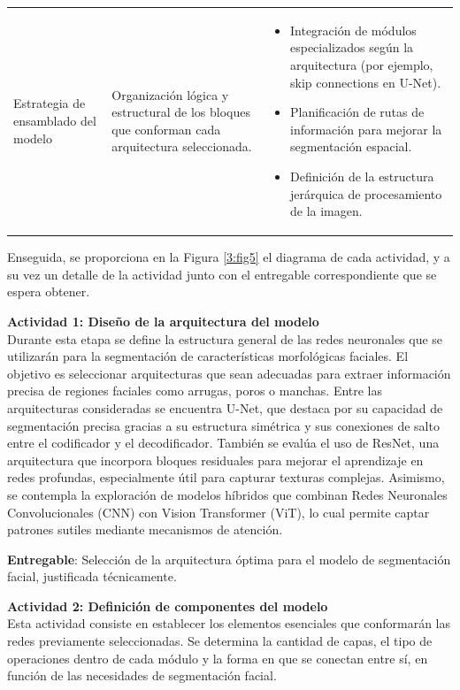 \begin{longtable}{p{4cm} p{6cm} p{6cm}}
 Estrategia de ensamblado del modelo & Organización lógica y estructural de los bloques que conforman cada arquitectura seleccionada. &
 \begin{itemize}
     \item Integración de módulos especializados según la arquitectura (por ejemplo, skip connections en U-Net).
     \item Planificación de rutas de información para mejorar la segmentación espacial.
     \item Definición de la estructura jerárquica de procesamiento de la imagen.
 \end{itemize} \\
 
 \end{longtable}
 \endgroup

 Enseguida, se proporciona en la Figura \ref{3:fig5} el diagrama de cada actividad, y a su vez un detalle de la actividad junto con el entregable correspondiente que se espera obtener.
 
 \textbf{Actividad 1: Diseño de la arquitectura del modelo}
 \\
 Durante esta etapa se define la estructura general de las redes neuronales que se utilizarán para la segmentación de características morfológicas faciales. El objetivo es seleccionar arquitecturas que sean adecuadas para extraer información precisa de regiones faciales como arrugas, poros o manchas.
 Entre las arquitecturas consideradas se encuentra U-Net, que destaca por su capacidad de segmentación precisa gracias a su estructura simétrica y sus conexiones de salto entre el codificador y el decodificador. También se evalúa el uso de ResNet, una arquitectura que incorpora bloques residuales para mejorar el aprendizaje en redes profundas, especialmente útil para capturar texturas complejas. Asimismo, se contempla la exploración de modelos híbridos que combinan Redes Neuronales Convolucionales (CNN) con Vision Transformer (ViT), lo cual permite captar patrones sutiles mediante mecanismos de atención.
 
 \textbf{Entregable}: Selección de la arquitectura óptima para el modelo de segmentación facial, justificada técnicamente.

 \textbf{Actividad 2: Definición de componentes del modelo}
 \\
Esta actividad consiste en establecer los elementos esenciales que conformarán las redes previamente seleccionadas. Se determina la cantidad de capas, el tipo de operaciones dentro de cada módulo y la forma en que se conectan entre sí, en función de las necesidades de segmentación facial.

